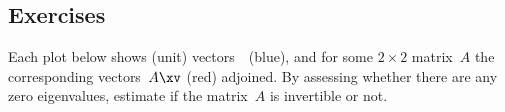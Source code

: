 \begin{comment}
Could define positive/negative semi-definite forms/matrices.
But seems incidental so do not write yet.
\end{comment}




\begin{comment} \label{ex:} 
Could have an optional application section on the following problem: useful whenever we can assess any pair of items, but do not have a framework for their absolute position.
Find \(m\) points in \(n\)D given that you know their distance
matrix and given that the mean location is precisely zero
\cite[p.83]{Hopcroft2014}. 
See \verb|multiDscaling.m|
\end{comment}







\subsection{Exercises}


\begin{exercise} \label{ex:} 
Each plot below shows (unit) vectors~\xv\ (blue), and for some \(2\times 2\) matrix~\(A\) the corresponding vectors~\(A\xv\) (red) adjoined. 
By assessing whether there are any zero eigenvalues, estimate if the matrix~\(A\) is invertible or not.

\begin{parts}
\item{}%

\item{}

\item{}

\item{}%

\item{}

\item{}

\end{parts}
\end{exercise}


